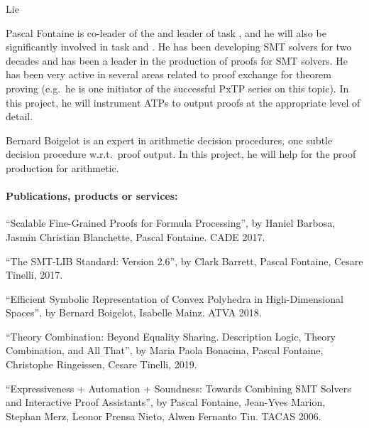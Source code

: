 \begin{sitedescription}{Lie}
\begin{compactitem}
\item Pascal Fontaine is co-leader of the  and leader of task
  , and he will also be significantly involved in
  task  and .  He
  has been developing SMT solvers for two decades and has been a leader in the
  production of proofs for SMT solvers.  He has been very active in several
  areas related to proof exchange for theorem proving (e.g.\ he is one initiator
  of the successful PxTP series on this topic).  In this project, he will instrument ATPs to
  output proofs at the appropriate level of detail.
\item Bernard Boigelot is an expert in arithmetic decision procedures, one
  subtle decision procedure w.r.t.\ proof output.  In this project, he will help
  for the proof production for arithmetic.
\end{compactitem}

\paragraph*{Publications, products or services:}

\begin{compactitem}
\item ``Scalable Fine-Grained Proofs for Formula Processing'', by Haniel Barbosa, Jasmin Christian Blanchette, Pascal Fontaine. CADE 2017.

\item ``The SMT-LIB Standard: Version 2.6'', by Clark Barrett, Pascal Fontaine, Cesare Tinelli, 2017.

\item ``Efficient Symbolic Representation of Convex Polyhedra in High-Dimensional Spaces'', by Bernard Boigelot, Isabelle Mainz. ATVA 2018.

\item ``Theory Combination: Beyond Equality Sharing. Description Logic, Theory Combination, and All That'', by Maria Paola Bonacina, Pascal Fontaine, Christophe Ringeissen, Cesare Tinelli, 2019.

\item ``Expressiveness + Automation + Soundness: Towards Combining SMT Solvers and Interactive Proof Assistants'', by Pascal Fontaine, Jean-Yves Marion, Stephan Merz, Leonor Prensa Nieto, Alwen Fernanto Tiu. TACAS 2006.
\end{compactitem}


\end{sitedescription}
